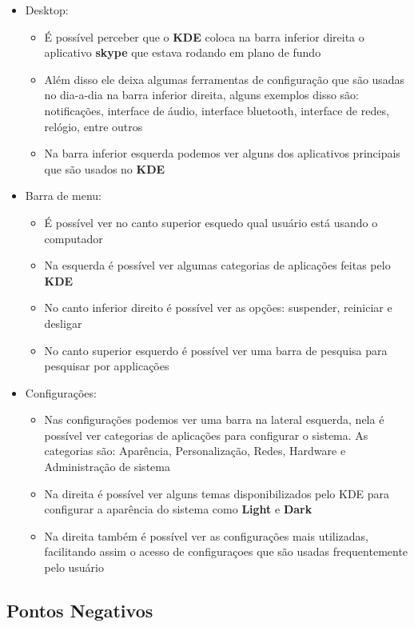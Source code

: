 \documentclass[10pt]{article}
\begin{document}
\begin{itemize}
    \item Desktop:
    \begin{itemize}
        \item É possível perceber que o \textbf{KDE} coloca na barra inferior direita o aplicativo \textbf{skype} que estava rodando em plano de fundo
        \item Além disso ele deixa algumas ferramentas de configuração que são usadas no dia-a-dia na barra inferior direita, alguns exemplos disso são: notificações, interface de áudio, interface bluetooth, interface de redes, relógio, entre outros
        \item Na barra inferior esquerda podemos ver alguns dos aplicativos principais que são usados no \textbf{KDE}
    \end{itemize}
    \item Barra de menu:
    \begin{itemize}
        \item É possível ver no canto superior esquedo qual usuário está usando o computador
        \item Na esquerda é possível ver algumas categorias de aplicações feitas pelo \textbf{KDE}
        \item No canto inferior direito é possível ver as opções: suspender, reiniciar e desligar
        \item No canto superior esquerdo é possível ver uma barra de pesquisa para pesquisar por applicações
    \end{itemize}
    \item Configurações:
    \begin{itemize}
        \item Nas configurações podemos ver uma barra na lateral esquerda, nela é possível ver categorias de aplicações para configurar o sistema. As categorias são: Aparência, Personalização, Redes, Hardware e Administração de sistema
        \item Na direita é possível ver alguns temas disponibilizados pelo KDE para configurar a aparência do sistema como \textbf{Light} e \textbf{Dark}
        \item Na direita também é possível ver as configurações mais utilizadas, facilitando assim o acesso de configuraçoes que são usadas frequentemente pelo usuário
    \end{itemize}
\end{itemize}

\subsection{Pontos Negativos} \hfill
\end{document}
